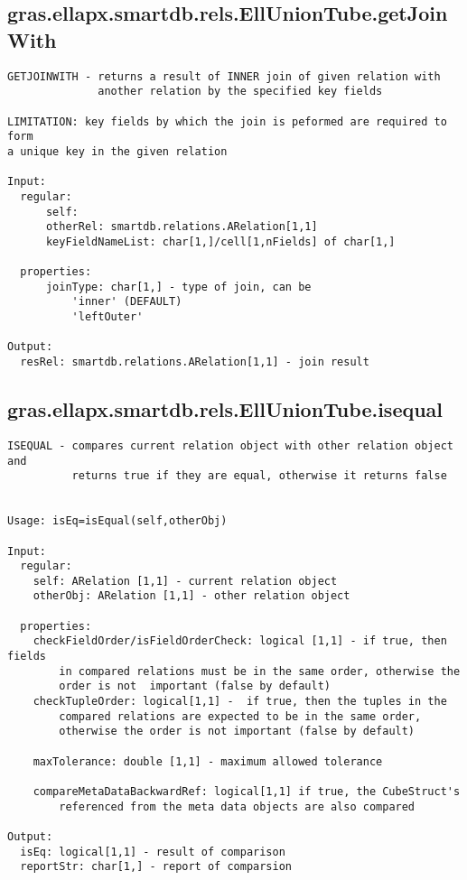\subsection{\texorpdfstring{gras.ellapx.smartdb.rels.EllUnionTube.getJoinWith}{getJoinWith}}\label{method:gras.ellapx.smartdb.rels.EllUnionTube.getJoinWith}
\begin{verbatim}
GETJOINWITH - returns a result of INNER join of given relation with
              another relation by the specified key fields

LIMITATION: key fields by which the join is peformed are required to form
a unique key in the given relation

Input:
  regular:
      self:
      otherRel: smartdb.relations.ARelation[1,1]
      keyFieldNameList: char[1,]/cell[1,nFields] of char[1,]

  properties:
      joinType: char[1,] - type of join, can be
          'inner' (DEFAULT)
          'leftOuter'

Output:
  resRel: smartdb.relations.ARelation[1,1] - join result
\end{verbatim}
\subsection{\texorpdfstring{gras.ellapx.smartdb.rels.EllUnionTube.isequal}{isequal}}\label{method:gras.ellapx.smartdb.rels.EllUnionTube.isequal}
\begin{verbatim}
ISEQUAL - compares current relation object with other relation object and
          returns true if they are equal, otherwise it returns false


Usage: isEq=isEqual(self,otherObj)

Input:
  regular:
    self: ARelation [1,1] - current relation object
    otherObj: ARelation [1,1] - other relation object

  properties:
    checkFieldOrder/isFieldOrderCheck: logical [1,1] - if true, then fields
        in compared relations must be in the same order, otherwise the
        order is not  important (false by default)
    checkTupleOrder: logical[1,1] -  if true, then the tuples in the
        compared relations are expected to be in the same order,
        otherwise the order is not important (false by default)

    maxTolerance: double [1,1] - maximum allowed tolerance

    compareMetaDataBackwardRef: logical[1,1] if true, the CubeStruct's
        referenced from the meta data objects are also compared

Output:
  isEq: logical[1,1] - result of comparison
  reportStr: char[1,] - report of comparsion
\end{verbatim}
